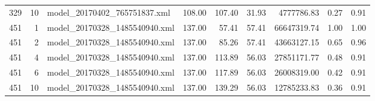 \begin{table}[ht]
\begin{tabular}{rrlrrrrrr}
  329 &  10 & model\_20170402\_765751837.xml & 108.00 & 107.40 & 31.93 & 4777786.83 & 0.27 & 0.91 \\ 
  451 &   1 & model\_20170328\_1485540940.xml & 137.00 & 57.41 & 57.41 & 66647319.74 & 1.00 & 1.00 \\ 
  451 &   2 & model\_20170328\_1485540940.xml & 137.00 & 85.26 & 57.41 & 43663127.15 & 0.65 & 0.96 \\ 
  451 &   4 & model\_20170328\_1485540940.xml & 137.00 & 113.89 & 56.03 & 27851171.77 & 0.48 & 0.91 \\ 
  451 &   6 & model\_20170328\_1485540940.xml & 137.00 & 117.89 & 56.03 & 26008319.00 & 0.42 & 0.91 \\ 
  451 &  10 & model\_20170328\_1485540940.xml & 137.00 & 139.29 & 56.03 & 12785233.83 & 0.36 & 0.91 \\ 
   \hline
\end{tabular}
\end{table}
